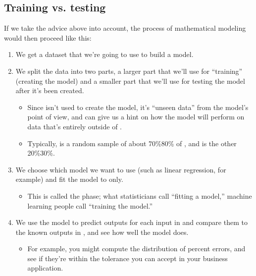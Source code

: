 \documentclass[letterpaper,10pt,english]{sphinxmanual}
\begin{document}
\subsection{Training vs. testing}
\label{\detokenize{chapter-17-machine-learning:training-vs-testing}}
If we take the advice above into account, the process of mathematical modeling would then proceed like this:
\begin{enumerate}
%
\item {} 
We get a dataset  that we’re going to use to build a model.

\item {} 
We split the data into two parts, a larger part  that we’ll use for “training” (creating the model) and a smaller part  that we’ll use for testing the model after it’s been created.
\begin{itemize}
\item {} 
Since  isn’t used to create the model, it’s “unseen data” from the model’s point of view, and can give us a hint on how the model will perform on data that’s entirely outside of .

\item {} 
Typically,  is a random sample of about 70\%\sphinxhyphen{}80\% of , and  is the other 20\%\sphinxhyphen{}30\%.

\end{itemize}

\item {} 
We choose which model we want to use (such as linear regression, for example) and fit the model to  only.
\begin{itemize}
\item {} 
This is called the  phase; what statisticians call “fitting a model,” machine learning people call “training the model.”

\end{itemize}

\item {} 
We use the model to predict outputs for each input in  and compare them to the known outputs in , and see how well the model does.
\begin{itemize}
\item {} 
For example, you might compute the distribution of percent errors, and see if they’re within the tolerance you can accept in your business application.


\end{itemize}
\end{enumerate}
\end{document}
